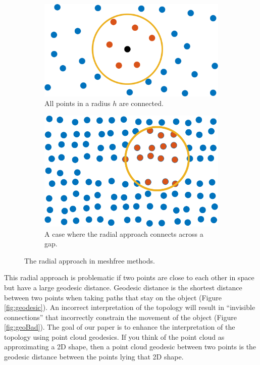 \documentclass[11pt,a4paper, final, twoside]{article}
\theoremstyle{proposition}
\theoremstyle{definition}
\theoremstyle{remark}
\numberwithin{equation}{section}
\begin{document}
\begin{figure}[h]
\centering
\begin{subfigure}[t]{.5\textwidth}
  \centering
  \includegraphics[width=.7\linewidth]{smallRadius.png}
  \caption{All points in a radius $h$ are connected.}
\end{subfigure}%
\begin{subfigure}[t]{.5\textwidth}
  \centering
  \includegraphics[width=.7\linewidth]{badRadius.png}
  \caption{A case where the radial approach connects across a gap.}
\end{subfigure}
\caption{The radial approach in meshfree methods.}
\label{fig:radius}
\end{figure}

This radial approach is problematic if two points are close to each other in space but have a large geodesic distance. Geodesic distance is the shortest distance between two points when taking paths that stay on the object (Figure \ref{fig:geodesic}). An incorrect interpretation of the topology will result in ``invisible connections'' that incorrectly constrain the movement of the object (Figure \ref{fig:geoBad}). The goal of our paper is to enhance the interpretation of the topology using point cloud geodesics. If you think of the point cloud as approximating a 2D shape, then a point cloud geodesic between two points is the geodesic distance between the points lying that 2D shape.
\end{document}
